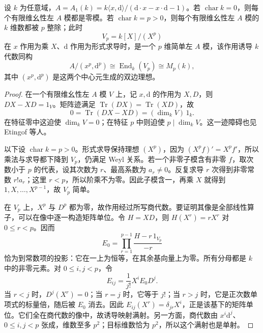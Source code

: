 \begin{proposition}\label{b2:prop:weyl-finite-dimensional-representations}
	设 \(k\) 为任意域，\(A=A_1(k)=k\langle x,\mathrm{d}\rangle/(\mathrm{d}\cdot x-x\cdot\mathrm{d}-1)\)。若 \(\operatorname{char}k=0\)，则每个有限维幺性左 \(A\) 模都是零模。若 \(\operatorname{char}k=p>0\)，则每个有限维幺性左 \(A\) 模的 \(k\) 维数都被 \(p\) 整除；此时
	\[
		V_p=k[X]/(X^p)
	\]
	在 \(x\) 作用为乘 \(X\)、\(\mathrm{d}\) 作用为形式求导时，是一个 \(p\) 维简单左 \(A\) 模，该作用诱导 \(k\) 代数同构
	\[
		A/(x^p,\mathrm{d}^p)\cong\operatorname{End}_k(V_p)\cong M_p(k),
	\]
	其中 \((x^p,\mathrm{d}^p)\) 是这两个中心元生成的双边理想。
\end{proposition}
\begin{proof}
	在一个有限维幺性左 \(A\) 模 \(V\) 上，记 \(x,\mathrm{d}\) 的作用为 \(X,D\)，则 \(DX-XD=1_V\)。矩阵迹满足 \(\operatorname{Tr}(DX)=\operatorname{Tr}(XD)\)，故
	\[
		0=\operatorname{Tr}(DX-XD)=(\dim_kV)\,1_k.
	\]
	在特征零中这迫使 \(\dim_kV=0\)；在特征 \(p\) 中则迫使 \(p\mid\dim_kV\)。这一迹障碍也见 Etingof 等人\cite[Problem 2.7.4, p. 18]{EtingofEtAl2011RepresentationTheory}。

	以下设 \(\operatorname{char}k=p>0\)。形式求导保持理想 \((X^p)\)，因为 \((X^pf)'=X^pf'\)，所以乘法与求导都下降到 \(V_p\)，仍满足 Weyl 关系。若一个非零子模含有非零 \(f\)，取次数小于 \(p\) 的代表，设其次数为 \(r\)、最高系数为 \(a_r\ne0\)。反复求导 \(r\) 次得到非零常数 \(r!a_r\)；这里 \(r<p\)，所以阶乘不为零。因此子模含一，再乘 \(X\) 就得到 \(1,X,\ldots,X^{p-1}\)，故 \(V_p\) 简单。

	在 \(V_p\) 上，\(X^p\) 与 \(D^p\) 都为零，故作用经过所写商代数。要证明其像是全部线性算子，可以在像中逐一构造矩阵单位。令 \(H=XD\)，则 \(H(X^r)=rX^r\) 对 \(0\le r<p\)。因而
	\[
		E_0=\prod_{r=1}^{p-1}\frac{H-r\,1_{V_p}}{-r}
	\]
	恰为到常数项的投影：它在一上为恒等，在其余基向量上为零。所有分母都是 \(k\) 中的非零元素。对 \(0\le i,j<p\)，令
	\[
		E_{ij}=\frac{1}{j!}X^iE_0D^j.
	\]
	当 \(r<j\) 时，\(D^j(X^r)=0\)；当 \(r=j\) 时，它等于 \(j!\)；当 \(r>j\) 时，它是正次数单项式的标量倍，随后被 \(E_0\) 消去。因此 \(E_{ij}(X^r)=\delta_{jr}X^i\)，正是该基下的矩阵单位。它们全在商代数的像中，故诱导映射满射。另一方面，商代数由 \(x^i\mathrm{d}^j\)、\(0\le i,j<p\) 张成，维数至多 \(p^2\)；目标维数恰为 \(p^2\)，所以这个满射也是单射。
\end{proof}
